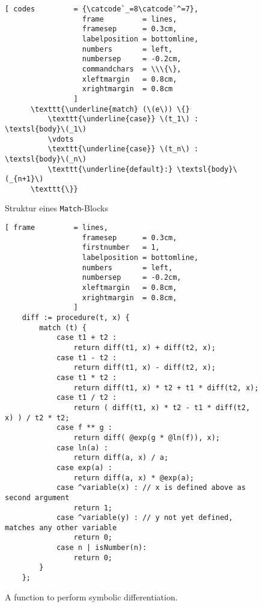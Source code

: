 \begin{figure}[!ht]
  \centering
\begin{Verbatim}[ codes         = {\catcode`_=8\catcode`^=7},
                  frame         = lines, 
                  framesep      = 0.3cm, 
                  labelposition = bottomline,
                  numbers       = left,
                  numbersep     = -0.2cm,
                  commandchars  = \\\{\},
                  xleftmargin   = 0.8cm,
                  xrightmargin  = 0.8cm
                ]
      \texttt{\underline{match} (\(e\)) \{}
          \texttt{\underline{case}} \(t_1\) : \textsl{body}\(_1\) 
          \vdots
          \texttt{\underline{case}} \(t_n\) : \textsl{body}\(_n\)
          \texttt{\underline{default}:} \textsl{body}\(_{n+1}\)
      \texttt{\}}
\end{Verbatim}
\vspace*{-0.3cm}
\caption{Struktur eines \texttt{Match}-Blocks}  \label{fig:match}
\end{figure} 


\begin{figure}[!ht]
\centering
\begin{Verbatim}[ frame         = lines, 
                  framesep      = 0.3cm, 
                  firstnumber   = 1,
                  labelposition = bottomline,
                  numbers       = left,
                  numbersep     = -0.2cm,
                  xleftmargin   = 0.8cm,
                  xrightmargin  = 0.8cm,
                ]
    diff := procedure(t, x) {
        match (t) {
            case t1 + t2 :
                return diff(t1, x) + diff(t2, x);
            case t1 - t2 :
                return diff(t1, x) - diff(t2, x);
            case t1 * t2 :
                return diff(t1, x) * t2 + t1 * diff(t2, x);
            case t1 / t2 :
                return ( diff(t1, x) * t2 - t1 * diff(t2, x) ) / t2 * t2;
            case f ** g :
                return diff( @exp(g * @ln(f)), x);
            case ln(a) :
                return diff(a, x) / a;
            case exp(a) :
                return diff(a, x) * @exp(a);
            case ^variable(x) : // x is defined above as second argument
                return 1;
            case ^variable(y) : // y not yet defined, matches any other variable
                return 0;
            case n | isNumber(n):   
                return 0;  
        }
    };
\end{Verbatim}
\vspace*{-0.3cm}
\caption{A function to perform symbolic differentiation.}
\label{fig:diff.stlx}
\end{figure}

